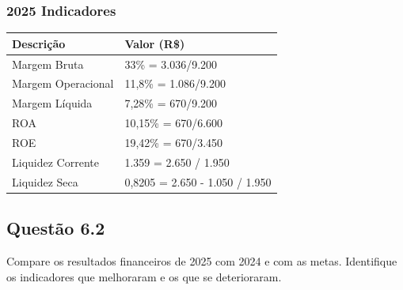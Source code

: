 \subsubsection{2025 Indicadores}
 \begin{tabular}{p{5cm} l}                                                     
 \toprule                                                                       
 \textbf{Descrição} & \textbf{Valor (R\$)} \\                                   
 \midrule                                                                       
 Margem Bruta & 33\% = 3.036/9.200 \\                                        
 \midrule                                                                       
 Margem Operacional  & 11,8\% = 1.086/9.200 \\                                                 
 \midrule                                                                       
 Margem Líquida & 7,28\% = 670/9.200 \\                                                     
  \midrule                                                                       
 ROA & 10,15\% = 670/6.600 \\                                               
 \midrule                                                                       
 ROE & 19,42\% = 670/3.450 \\                                        
 \midrule                                                                       
 Liquidez Corrente & 1.359 =  2.650 / 1.950 \\                                        
 \midrule                                                                       
 Liquidez Seca & 0,8205 =  2.650 - 1.050 / 1.950 \\ 
 \bottomrule                                                                    
 \end{tabular}                                                                  
\subsection{Questão 6.2}
Compare os resultados financeiros de 2025 com 2024 e com as metas. Identifique os indicadores que melhoraram e os que se deterioraram.
